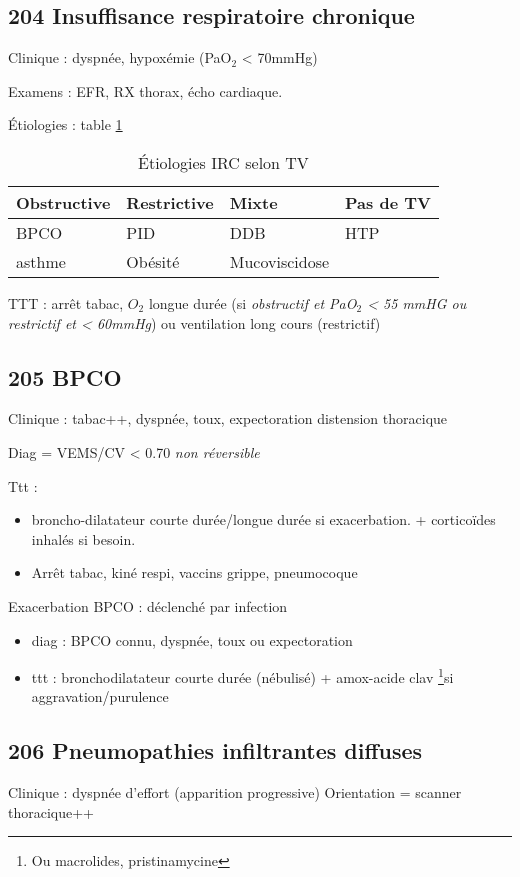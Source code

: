 \documentclass[11pt]{article}
\begin{document}
\subsection{204 Insuffisance respiratoire chronique}
\label{sec:org55bd9ae}
Clinique : dyspnée, hypoxémie (PaO\(_{\text{2}}\) < 70mmHg)

Examens : EFR, RX thorax, écho cardiaque.

Étiologies : table \ref{tab:orgdc21a14}

\begin{table}[htbp]
\caption{\label{tab:orgdc21a14}
Étiologies IRC selon TV}
\centering
\begin{tabular}{llll}
Obstructive & Restrictive & Mixte & Pas de TV\\
\hline
BPCO & PID & DDB & HTP\\
asthme & Obésité & Mucoviscidose & \\
\end{tabular}
\end{table}

TTT : arrêt tabac, \(O_2\) longue durée (si \emph{obstructif et PaO\(_{\text{2}}\) < 55 mmHG ou
   restrictif et < 60mmHg}) ou ventilation long cours (restrictif)
\subsection{205 BPCO}
\label{sec:org674ecfa}

Clinique : tabac++, dyspnée, toux, expectoration \textpm{} distension thoracique 

Diag = VEMS/CV < 0.70 \emph{non réversible}

Ttt : 
\begin{itemize}
\item broncho-dilatateur courte durée/longue durée si exacerbation. + corticoïdes
inhalés si besoin.
\item Arrêt tabac, kiné respi, vaccins grippe, pneumocoque
\end{itemize}

Exacerbation BPCO : déclenché par infection
\begin{itemize}
\item diag : BPCO connu, \inc dyspnée, toux ou expectoration
\item ttt : bronchodilatateur courte durée (nébulisé) + amox-acide clav \footnote{Ou macrolides, pristinamycine}si
aggravation/\inc purulence
\end{itemize}
\subsection{206 Pneumopathies infiltrantes diffuses}
\label{sec:org0e5b716}
Clinique : dyspnée d'effort (apparition progressive)
   Orientation = scanner thoracique++
\end{document}
